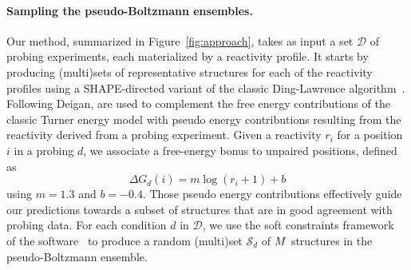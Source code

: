 \documentclass[a4,center,fleqn]{NAR}
\begin{document}
\paragraph{Sampling the pseudo-Boltzmann ensembles.} Our method, summarized in Figure~\ref{fig:approach}, takes as input a set $\mathcal{D}$ of probing experiments, each materialized by a reactivity profile. It starts by producing (multi)sets of representative structures for each of the reactivity profiles using a SHAPE-directed variant of the classic Ding-Lawrence algorithm~\citep{Ding2003}. Following Deigan\etal\cite{Deigan2009},  are used to complement the free energy contributions of the classic Turner energy model with pseudo energy contributions resulting from the reactivity derived from a probing experiment.  Given a reactivity $r_i$ for a position $i$ in a probing $d$, we associate a free-energy bonus to unpaired positions, defined as
$$\Delta G_d(i) = m \log(r_i +1 )+b$$ 
using $m=1.3$ and  $b=-0.4$.  Those pseudo energy contributions effectively guide our predictions towards a subset of structures that are in good agreement with probing data. For each condition $d$ in $\mathcal{D}$, we use the soft constraints framework~\cite{Lorenz2016} of the  software~\cite{Lorenz2011} to produce a random (multi)set $\mathcal{S}_d$ of $M$ structures in the pseudo-Boltzmann ensemble.
\end{document}
